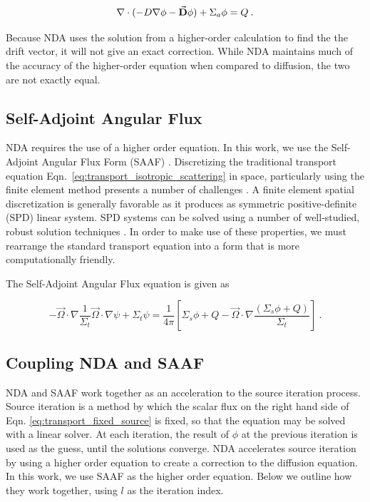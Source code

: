   \begin{equation}
  \nabla\cdot(-D \nabla \phi - \vec{\bf D} \phi) + \Sigma_a \phi = Q \:. \label{eq:NDA_1g}
  \end{equation}
  
Because NDA uses the solution from a higher-order calculation to find the the drift vector, it will not give an exact correction. While NDA maintains much of the accuracy of the higher-order equation when compared to diffusion, the two are not exactly equal. 




\subsection{Self-Adjoint Angular Flux}
NDA requires the use of a higher order equation. In this work, we use the Self-Adjoint Angular Flux Form (SAAF) \cite{SAAF}. Discretizing the traditional transport equation Eqn.~\eqref{eq:transport_isotropic_scattering} in space, particularly using the finite element method presents a number of challenges \cite{saaf}. A finite element spatial discretization is generally favorable as it produces as symmetric positive-definite (SPD) linear system. SPD systems can be solved using a number of well-studied, robust solution techniques \cite{Shewchuck1994}. In order to make use of these properties, we must rearrange the standard transport equation into a form that is more computationally friendly.

The Self-Adjoint Angular Flux equation is given as

\begin{equation}
    - \vec{\Omega} \cdot \nabla \frac{1}{\Sigma_t}\vec{\Omega} \cdot \nabla \psi + \Sigma_t \psi = \frac{1}{4\pi}[\Sigma_s\phi + Q - \vec{\Omega} \cdot \nabla \frac{(\Sigma_s\phi + Q)}{\Sigma_t}]\:.
    \label{eq:SAAF}
\end{equation}


\subsection{Coupling NDA and SAAF}
NDA and SAAF work together as an acceleration to the source iteration process. Source iteration is a method by which the scalar flux on the right hand side of Eqn. \eqref{eq:transport_fixed_source} is fixed, so that the equation may be solved with a linear solver. At each iteration, the result of $\phi$ at the previous iteration is used as the guess, until the solutions converge. NDA accelerates source iteration by using a higher order equation to create a correction to the diffusion equation. In this work, we use SAAF as the higher order equation. Below we outline how they work together, using $l$ as the iteration index.


